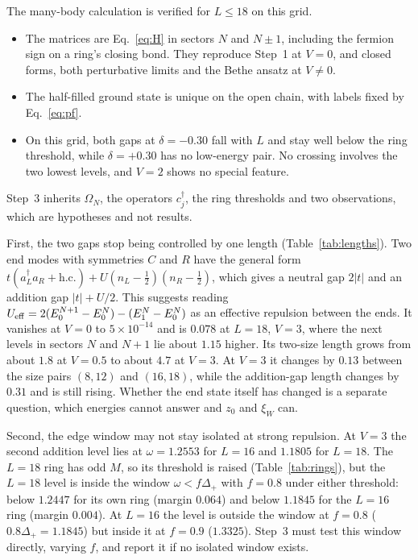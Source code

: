 \documentclass[11pt,a4paper]{article}
\newcommand{\dg}{^{\dagger}}
\begin{document}
The many-body calculation is verified for $L\le18$ on this grid.
\begin{itemize}
  \item The matrices are Eq.~\eqref{eq:H} in sectors $N$ and $N\pm1$, including the fermion sign on a ring's closing bond.
  They reproduce Step~1 at $V=0$, and closed forms, both perturbative limits and the Bethe ansatz at $V\neq0$.
  \item The half-filled ground state is unique on the open chain, with labels fixed by Eq.~\eqref{eq:pf}.
  \item On this grid, both gaps at $\delta=-0.30$ fall with $L$ and stay well below the ring threshold, while $\delta=+0.30$ has no low-energy pair.
  No crossing involves the two lowest levels, and $V=2$ shows no special feature.
\end{itemize}
Step~3 inherits $\Omega_N$, the operators $c_j\dg$, the ring thresholds and two observations, which are hypotheses and not results.

First, the two gaps stop being controlled by one length (Table~\ref{tab:lengths}).
Two end modes with symmetries $C$ and $R$ have the general form $t(a_L\dg a_R+\text{h.c.})+U(n_L-\tfrac12)(n_R-\tfrac12)$, which gives a neutral gap $2|t|$ and an addition gap $|t|+U/2$.
This suggests reading $U_{\rm eff}=2(E_0^{N+1}-E_0^N)-(E_1^N-E_0^N)$ as an effective repulsion between the ends.
It vanishes at $V=0$ to $5\times10^{-14}$ and is $0.078$ at $L=18$, $V=3$, where the next levels in sectors $N$ and $N+1$ lie about $1.15$ higher.
Its two-size length grows from about $1.8$ at $V=0.5$ to about $4.7$ at $V=3$.
At $V=3$ it changes by $0.13$ between the size pairs $(8,12)$ and $(16,18)$, while the addition-gap length changes by $0.31$ and is still rising.
Whether the end state itself has changed is a separate question, which energies cannot answer and $z_0$ and $\xi_W$ can.

Second, the edge window may not stay isolated at strong repulsion.
At $V=3$ the second addition level lies at $\omega=1.2553$ for $L=16$ and $1.1805$ for $L=18$.
The $L=18$ ring has odd $M$, so its threshold is raised (Table~\ref{tab:rings}), but the $L=18$ level is inside the window $\omega<f\Delta_+$ with $f=0.8$ under either threshold: below $1.2447$ for its own ring (margin $0.064$) and below $1.1845$ for the $L=16$ ring (margin $0.004$).
At $L=16$ the level is outside the window at $f=0.8$ ($0.8\Delta_+=1.1845$) but inside it at $f=0.9$ ($1.3325$).
Step~3 must test this window directly, varying $f$, and report it if no isolated window exists.
\end{document}
